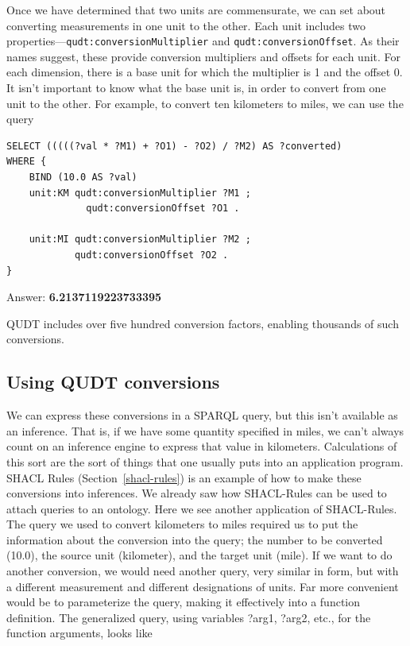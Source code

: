 Once we have determined that two units are commensurate, we can set
about converting measurements in one unit to the other. Each unit
includes two properties---\texttt{qudt:conversionMultiplier} and
\texttt{qudt:conversionOffset}. As their names suggest, these provide conversion
multipliers and offsets for each unit. For each dimension, there is a
base unit for which the multiplier is 1 and the offset 0. It isn't
important to know what the base unit is, in order to convert from one
unit to the other. For example, to convert ten kilometers to miles, we
can use the query

\begin{lstlisting}
SELECT (((((?val * ?M1) + ?O1) - ?O2) / ?M2) AS ?converted)
WHERE {
    BIND (10.0 AS ?val)
    unit:KM qudt:conversionMultiplier ?M1 ;
              qudt:conversionOffset ?O1 .
    
    unit:MI qudt:conversionMultiplier ?M2 ;
            qudt:conversionOffset ?O2 .
}
\end{lstlisting}


Answer: \textbf{6.2137119223733395}

QUDT includes over five hundred conversion factors, enabling thousands
of such conversions.

\subsection{Using QUDT conversions}

We can express these conversions in a SPARQL query, but this isn't
available as an inference. That is, if we have some quantity specified
in miles, we can't always count on an inference engine to express that
value in kilometers. Calculations of this sort are the sort of things
that one usually puts into an application program. SHACL Rules
(Section~\ref{shacl-rules}) is an example of
how to make these conversions into inferences.  
We already saw how SHACL-Rules can  be used to
attach queries to an ontology. Here we see another application of SHACL-Rules.
The query we used to convert kilometers to miles required us to put the
information about the conversion into the query; the number to be
converted (10.0), the source unit (kilometer), and the target unit
(mile). If we want to do another conversion, we would need another
query, very similar in form, but with a different measurement and
different designations of units. Far more convenient would be to
parameterize the query, making it effectively into a function
definition. The generalized query, using variables ?arg1, ?arg2, etc.,
for the function arguments, looks like

